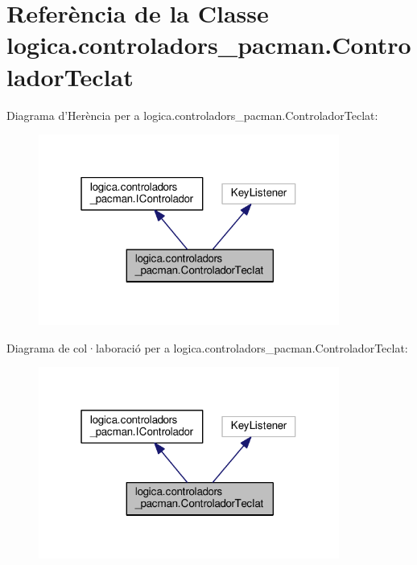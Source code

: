 \hypertarget{classlogica_1_1controladors__pacman_1_1_controlador_teclat}{\section{Referència de la Classe logica.\+controladors\+\_\+pacman.\+Controlador\+Teclat}
\label{classlogica_1_1controladors__pacman_1_1_controlador_teclat}
}


Diagrama d'Herència per a logica.\+controladors\+\_\+pacman.\+Controlador\+Teclat\+:\nopagebreak
\begin{figure}[H]
\begin{center}
\leavevmode
\includegraphics[width=280pt]{classlogica_1_1controladors__pacman_1_1_controlador_teclat__inherit__graph}
\end{center}
\end{figure}


Diagrama de col·laboració per a logica.\+controladors\+\_\+pacman.\+Controlador\+Teclat\+:\nopagebreak
\begin{figure}[H]
\begin{center}
\leavevmode
\includegraphics[width=280pt]{classlogica_1_1controladors__pacman_1_1_controlador_teclat__coll__graph}
\end{center}
\end{figure}
